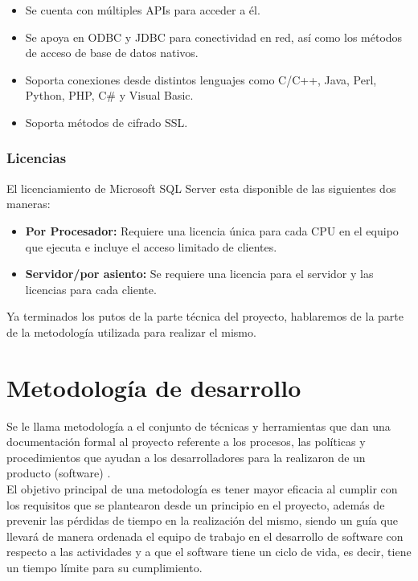 			\begin{itemize}
				\item Se cuenta con m\'ultiples APIs para acceder a \'el.
				\item Se apoya en ODBC y JDBC para conectividad en red, as\'i como los m\'etodos de acceso de base de datos nativos.
				\item Soporta conexiones desde distintos lenguajes como C/C++, Java, Perl, Python, PHP, C\# y Visual Basic.
				\item Soporta m\'etodos de cifrado SSL.
			\end{itemize}

		\subsubsection{Licencias}

			El licenciamiento de Microsoft SQL Server esta disponible de las siguientes dos maneras:
			\begin{itemize}
				\item \textbf{Por Procesador:} Requiere una licencia \'unica para cada CPU en el equipo que ejecuta e incluye el acceso limitado de clientes.
				\item \textbf{Servidor/por asiento:} Se requiere una licencia para el servidor y las licencias para cada cliente.
			\end{itemize}

	Ya terminados los putos de la parte técnica del proyecto, hablaremos de la parte de la metodología utilizada para realizar el mismo.

\section{Metodolog\'ia de desarrollo}

	Se le llama metodolog\'ia a el conjunto de t\'ecnicas y herramientas que dan una documentaci\'on formal al proyecto referente a los procesos, las pol\'iticas y procedimientos que ayudan a los desarrolladores para la realizaron de un producto (software) .\\

	El objetivo principal de una metodolog\'ia es tener mayor eficacia al cumplir con los requisitos que se plantearon desde un principio en el proyecto, adem\'as  de prevenir las p\'erdidas de tiempo en la realizaci\'on del mismo, siendo un gu\'ia que llevar\'a de manera ordenada el equipo de trabajo en el desarrollo de software con respecto a las actividades y a que el software tiene un ciclo de vida, es decir, tiene un tiempo l\'imite para su cumplimiento.\\


